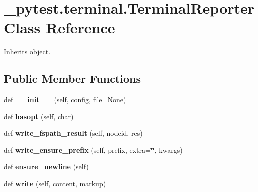 \hypertarget{class__pytest_1_1terminal_1_1_terminal_reporter}{}\section{\+\_\+pytest.\+terminal.\+Terminal\+Reporter Class Reference}
\label{class__pytest_1_1terminal_1_1_terminal_reporter}


Inherits object.

\subsection*{Public Member Functions}
\begin{DoxyCompactItemize}
\item 
\mbox{\label{class__pytest_1_1terminal_1_1_terminal_reporter_a87de5c75a300751edf37365508b7dff4}} 
def {\bfseries \+\_\+\+\_\+init\+\_\+\+\_\+} (self, config, file=None)
\item 
\mbox{\label{class__pytest_1_1terminal_1_1_terminal_reporter_a65aa30cf5a0eb7adc8747e69ed9ee5d2}} 
def {\bfseries hasopt} (self, char)
\item 
\mbox{\label{class__pytest_1_1terminal_1_1_terminal_reporter_ad58b987e6b5979d5f58be0a22513eeda}} 
def {\bfseries write\+\_\+fspath\+\_\+result} (self, nodeid, res)
\item 
\mbox{\label{class__pytest_1_1terminal_1_1_terminal_reporter_a3915d0911de35b0196659c08c6a0b676}} 
def {\bfseries write\+\_\+ensure\+\_\+prefix} (self, prefix, extra=\char`\"{}\char`\"{}, kwargs)
\item 
\mbox{\label{class__pytest_1_1terminal_1_1_terminal_reporter_a36eb1b47dd77f41904e8991f196e4e60}} 
def {\bfseries ensure\+\_\+newline} (self)
\item 
\mbox{\label{class__pytest_1_1terminal_1_1_terminal_reporter_a2bd164e372a666c6c5780d2a9f6e279a}} 
def {\bfseries write} (self, content, markup)

\end{DoxyCompactItemize}
